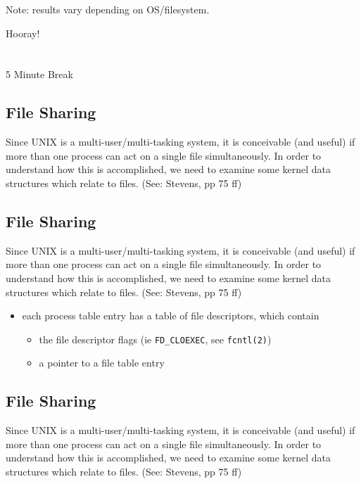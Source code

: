 \documentclass[xga]{xdvislides}
\begin{document}
Note: results vary depending on OS/filesystem.

\newpage
\vspace*{\fill}
\begin{center}
    \Hugesize
        Hooray! \\ [1em]
    \hspace*{5mm}
    \blueline\\
    \hspace*{5mm}\\
        5 Minute Break
\end{center}
\vspace*{\fill}


\subsection{File Sharing}
Since UNIX is a multi-user/multi-tasking system, it is conceivable (and
useful) if more than one process can act on a single file simultaneously. In
order to understand how this is accomplished, we need to examine some kernel
data structures which relate to files.  (See: Stevens, pp 75 ff)

\subsection{File Sharing}
Since UNIX is a multi-user/multi-tasking system, it is conceivable (and
useful) if more than one process can act on a single file simultaneously. In
order to understand how this is accomplished, we need to examine some kernel
data structures which relate to files.  (See: Stevens, pp 75 ff)

\begin{itemize}
	\item each process table entry has a table of file descriptors, which contain
		\begin{itemize}
			\item the file descriptor flags (ie {\tt FD\_CLOEXEC}, see \verb+fcntl(2)+)
			\item a pointer to a file table entry
		\end{itemize}
\end{itemize}

\subsection{File Sharing}
Since UNIX is a multi-user/multi-tasking system, it is conceivable (and
useful) if more than one process can act on a single file simultaneously. In
order to understand how this is accomplished, we need to examine some kernel
data structures which relate to files.  (See: Stevens, pp 75 ff)
\end{document}
